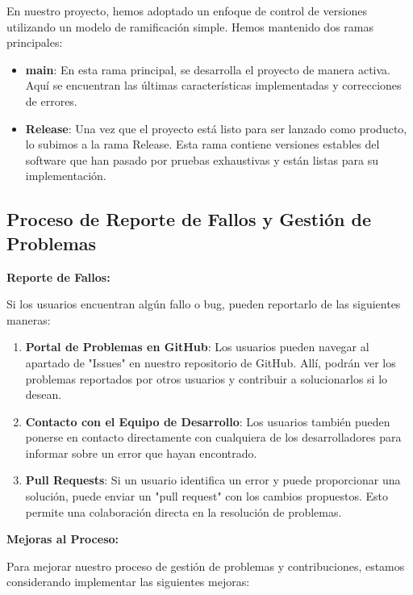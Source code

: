\documentclass{article}
\begin{document}
En nuestro proyecto, hemos adoptado un enfoque de control de versiones utilizando un modelo de ramificación simple. Hemos mantenido dos ramas principales:

\begin{itemize}
    \item \textbf{main}: En esta rama principal, se desarrolla el proyecto de manera activa. Aquí se encuentran las últimas características implementadas y correcciones de errores.
    
    \item \textbf{Release}: Una vez que el proyecto está listo para ser lanzado como producto, lo subimos a la rama Release. Esta rama contiene versiones estables del software que han pasado por pruebas exhaustivas y están listas para su implementación.
\end{itemize}

\subsection{Proceso de Reporte de Fallos y Gestión de Problemas}

\textbf{Reporte de Fallos:}

Si los usuarios encuentran algún fallo o bug, pueden reportarlo de las siguientes maneras:

\begin{enumerate}
    \item \textbf{Portal de Problemas en GitHub}: Los usuarios pueden navegar al apartado de "Issues" en nuestro repositorio de GitHub. Allí, podrán ver los problemas reportados por otros usuarios y contribuir a solucionarlos si lo desean.
    
    \item \textbf{Contacto con el Equipo de Desarrollo}: Los usuarios también pueden ponerse en contacto directamente con cualquiera de los desarrolladores para informar sobre un error que hayan encontrado.
    
    \item \textbf{Pull Requests}: Si un usuario identifica un error y puede proporcionar una solución, puede enviar un "pull request" con los cambios propuestos. Esto permite una colaboración directa en la resolución de problemas.
\end{enumerate}

\textbf{Mejoras al Proceso:}

Para mejorar nuestro proceso de gestión de problemas y contribuciones, estamos considerando implementar las siguientes mejoras:
\end{document}
